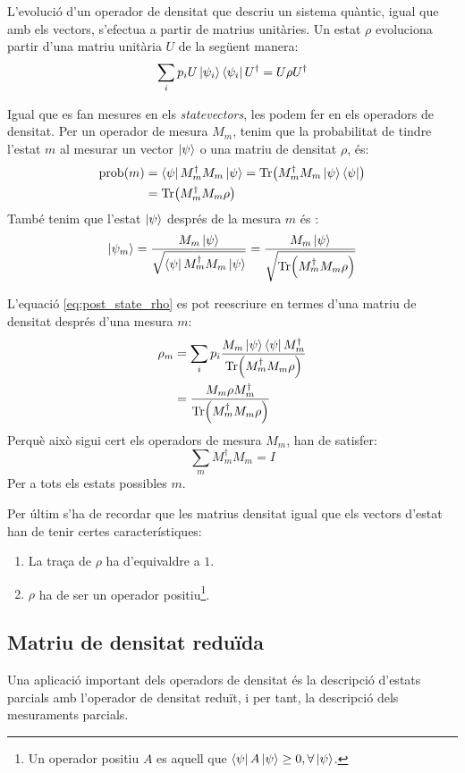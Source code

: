 L'evolució d'un operador de densitat que descriu un sistema quàntic, igual que amb els vectors, s'efectua a partir de matrius unitàries. Un estat $\rho$ evoluciona partir d'una matriu unitària $U$ de la següent manera:
$$
\sum_i p_i U \ket{\psi_i}\bra{\psi_i} U^\dagger = U\rho U^\dagger 
$$

Igual que es fan mesures en els \textit{statevectors}, les podem fer en els operadors de densitat. Per un operador de mesura $M_m$, tenim que la probabilitat de tindre l'estat $m$ al mesurar un vector $\ket{\psi}$ o una matriu de densitat $\rho$, és:
\begin{align*}
	\mathrm{prob}(m) &= \bra{\psi}M_m^\dagger M_m\ket{\psi} = \Tr(M_m^\dagger M_m \ket{\psi}\bra{\psi})\\ &= \Tr(M_m^\dagger M_m \rho)
\end{align*}
També tenim que l'estat $\ket{\psi}$ després de la mesura $m$ és \cite{QCandQI:density_matrix}:
\begin{equation}
	\ket{\psi_{m}} = \frac{M_m\ket{\psi}}{\sqrt{\bra{\psi}M_m^\dagger M_m \ket{\psi}}} = \frac{M_m\ket{\psi}}{\sqrt{\Tr(M_m^\dagger M_m \rho)}}
	\label{eq:post_state_rho}
\end{equation}

L'equació \ref{eq:post_state_rho} es pot reescriure en termes d'una matriu de densitat després d'una mesura $m$:
\begin{align*}
	\rho_m &= \sum_i p_i \frac{M_m\ket{\psi}\bra{\psi}M_m^\dagger}{\Tr(M_m^\dagger M_m \rho)} \\
	&= \frac{M_m\rho M_m^\dagger }{\Tr(M_m^\dagger M_m\rho)}
\end{align*}
Perquè això sigui cert els operadors de mesura $M_m$, han de satisfer:
$$
\sum_m M_m^\dagger M_m = I
$$
Per a tots els estats possibles $m$.

Per últim s'ha de recordar que les matrius densitat igual que els vectors d'estat han de tenir certes característiques:
\begin{enumerate}
	\item La traça de $\rho$ ha d'equivaldre a $1$.
	\item $\rho$ ha de ser un operador positiu\footnote{Un operador positiu $A$ es aquell que $\bra{\psi}A\ket{\psi}\geq0, \forall \ket{\psi}$.}.
\end{enumerate}
\subsection{Matriu de densitat reduïda}
Una aplicació important dels operadors de densitat és la descripció d'estats parcials amb l'operador de densitat reduït, i per tant, la descripció dels mesuraments parcials.


